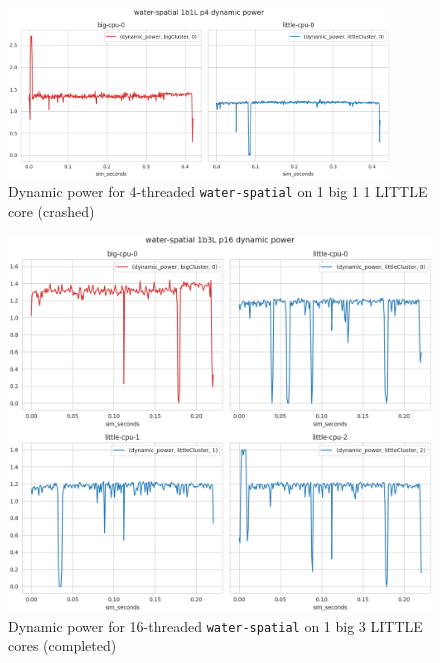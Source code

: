 \begin{figure}[H]
    \centering
    \includegraphics[width=0.9\textwidth]{roi-plots/water-spatial/1b1L/p4-fail-dyn-pow.png}
    \caption{Dynamic power for 4-threaded \texttt{water-spatial} on 1 big 1
             1 LITTLE core (crashed)}
\end{figure}

\begin{figure}[H]
    \centering
    \includegraphics[height=0.6\textheight]{roi-plots/water-spatial/1b3L/p16-success-dyn-pow.png}
    \caption{Dynamic power for 16-threaded \texttt{water-spatial} on 1 big 3
             LITTLE cores (completed)}
\end{figure}

